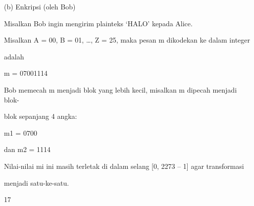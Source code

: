 \documentclass{article}
\begin{document}

(b) Enkripsi  (oleh Bob)

Misalkan Bob ingin mengirim plainteks ‘HALO’ kepada Alice. 

Misalkan A = 00, B = 01, …, Z = 25, maka pesan m dikodekan ke dalam integer  

adalah 

m = 07001114

Bob memecah m menjadi blok yang lebih kecil, misalkan m dipecah menjadi blok-

blok sepanjang 4 angka:

m1 = 0700

dan m2 = 1114

Nilai-nilai mi ini masih terletak di dalam selang [0, 2273 – 1] agar transformasi 

menjadi satu-ke-satu. 

17
\end{document}
